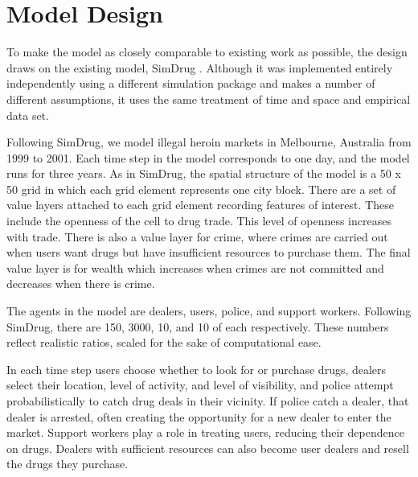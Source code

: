 \documentclass[runningheads,a4paper]{llncs}
\begin{document}

\section{Model Design}

To make the model as closely comparable to existing work as possible, the design draws on the existing model, SimDrug \cite{dray_policing_2008}. Although it was implemented entirely independently using a different simulation package and makes a number of different assumptions, it uses the same treatment of time and space and empirical data set.

Following SimDrug, we model illegal heroin markets in Melbourne, Australia from 1999 to 2001. Each time step in the model corresponds to one day, and the model runs for three years. As in SimDrug, the spatial structure of the model is a 50 x 50 grid in which each grid element represents one city block. There are a set of value layers attached to each grid element recording features of interest. These include the openness of the cell to drug trade. This level of openness increases with trade. There is also a value layer for crime, where crimes are carried out when users want drugs but have insufficient resources to purchase them. The final value layer is for wealth which increases when crimes are not committed and decreases when there is crime.

The agents in the model are dealers, users, police, and support workers. Following SimDrug, there are 150, 3000, 10, and 10 of each respectively. These numbers reflect realistic ratios, scaled for the sake of computational ease.

In each time step users choose whether to look for or purchase drugs, dealers select their location, level of activity, and level of visibility, and police attempt probabilistically to catch drug deals in their vicinity. If police catch a dealer, that dealer is arrested, often creating the opportunity for a new dealer to enter the market. Support workers play a role in treating users, reducing their dependence on drugs. Dealers with sufficient resources can also become user dealers and resell the drugs they purchase.
\end{document}

